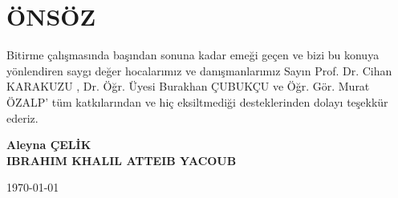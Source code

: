 \section*{ÖNSÖZ}
Bitirme çalışmasında başından sonuna kadar emeği geçen ve bizi bu konuya yönlendiren saygı değer hocalarımız ve danışmanlarımız Sayın Prof. Dr. Cihan KARAKUZU , Dr. Öğr. Üyesi Burakhan ÇUBUKÇU ve 
Öğr. Gör. Murat ÖZALP' tüm katkılarından ve hiç eksiltmediği desteklerinden dolayı teşekkür ederiz.

\begin{flushright}
\textbf{Aleyna ÇELİK \\ IBRAHIM KHALIL ATTEIB YACOUB}

\today
\end{flushright}